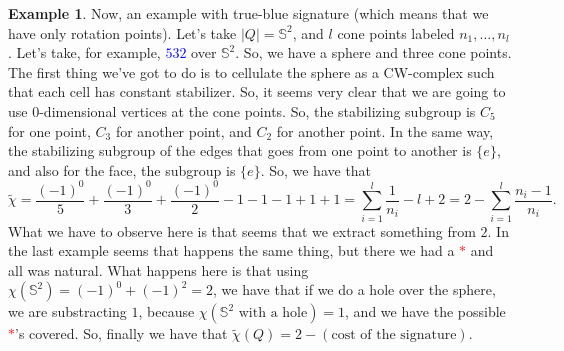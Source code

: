 \documentclass[12pt,a4paper,oneside]{article}
\numberwithin{equation}{section}
\theoremstyle{definition}
\newtheorem{example}{Example}
\begin{document}
\begin{example} Now, an example with true-blue signature (which means that we have only rotation points). Let's take $\vert Q \vert = \mathbb{S}^{2}$, and $l$ cone points labeled $n_{1}, \ldots, n_{l}$. Let's take, for example, \textcolor{blue}{$532$} over $\mathbb{S}^{2}$. So, we have a sphere and three cone points. The first thing we've got to do is to cellulate the sphere as a CW-complex such that each cell has constant stabilizer. So, it seems very clear that we are going to use $0$-dimensional vertices at the cone points. So, the stabilizing subgroup is $C_{5}$ for one point, $C_{3}$ for another point, and $C_{2}$ for another point. In the same way, the stabilizing subgroup of the edges that goes from one point to another is $\lbrace e \rbrace$, and also for the face, the subgroup is $\lbrace e \rbrace$. So, we have that $$\tilde{\chi} = \frac{(-1)^{0}}{5} + \frac{(-1)^{0}}{3} + \frac{(-1)^{0}}{2} - 1 - 1 - 1 + 1 + 1 = \sum_{i = 1}^{l} \frac{1}{n_{i}} - l + 2 = 2 - \sum_{i = 1}^{l} \frac{n_{i} - 1}{n_{i}}.$$
What we have to observe here is that seems that we extract something from $2$. In the last example seems that happens the same thing, but there we had a \textcolor{red}{$*$} and all was natural. What happens here is that using $\chi({\mathbb{S}^{2}}) = (-1)^{0} + (-1)^{2} = 2$, we have that if we do a hole over the sphere, we are substracting $1$, because $\chi(\mathbb{S}^{2} \text{ with a hole}) = 1$, and we have the possible \textcolor{red}{$*$}'s covered. So, finally we have that $\tilde{\chi}(Q) = 2 - (\text{cost of the signature})$.
\end{example}
\end{document}
